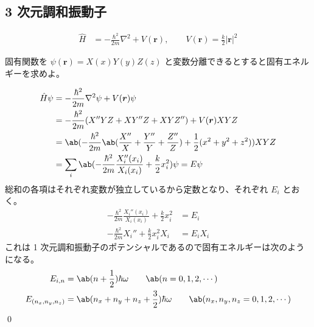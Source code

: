 \documentclass[uplatex,dvipdfmx,a4paper,11pt]{jlreq}
\makeatletter
\newcommand{\rr}{\bm{r}}
\newcommand{\laplacian}{\nabla^2}
\numberwithin{equation}{section}
\theoremstyle{definition}
\renewenvironment{proof}[1][\proofname]{\par
  \normalfont
  \topsep6\p@\@plus6\p@ \trivlist
  \item[\hskip\labelsep{\bfseries #1}\@addpunct{\bfseries}]\ignorespaces\quad\par
}{%
  \qed\endtrivlist\@endpefalse
}
\renewcommand\proofname{証明}
\makeatother
\begin{document}
\subsection{3 次元調和振動子}
\begin{align}
  \hat{H} & = -\frac{\hbar^2}{2m}\laplacian + V(\rr), \qquad V(\rr) = \frac{k}{2}|\rr|^2
\end{align}
\begin{problem}
固有関数を $\psi(\rr) = X(x)Y(y)Z(z)$ と変数分離できるとすると固有エネルギーを求めよ。
\end{problem}
\begin{proof}
  \begin{align}
    \hat{H}\psi & = -\frac{\hbar^2}{2m}\laplacian\psi + V(\rr)\psi                                                               \\
                & = -\frac{\hbar^2}{2m}(X''YZ + XY''Z + XYZ'') + V(\rr)XYZ                                                       \\
                & = \ab(-\frac{\hbar^2}{2m}\ab(\frac{X''}{X} + \frac{Y''}{Y} + \frac{Z''}{Z}) + \frac{1}{2}(x^2 + y^2 + z^2))XYZ \\
                & = \sum_{i}\ab(-\frac{\hbar^2}{2m}\frac{X_i''(x_i)}{X_i(x_i)} + \frac{k}{2}x_i^2)\psi = E\psi
  \end{align}
  総和の各項はそれぞれ変数が独立しているから定数となり、それぞれ $E_i$ とおく。
  \begin{align}
    -\frac{\hbar^2}{2m}\frac{X_i''(x_i)}{X_i(x_i)} + \frac{k}{2}x_i^2 & = E_i    \\
    -\frac{\hbar^2}{2m}X_i'' + \frac{k}{2}x_i^2X_i                    & = E_iX_i
  \end{align}
  これは 1 次元調和振動子のポテンシャルであるので固有エネルギーは次のようになる。
  \begin{align}
    E_{i,n}             & = \ab(n + \frac{1}{2})\hbar\omega \qquad \ab(n = 0, 1, 2, \cdots)                           \\
    E_{(n_x, n_y, n_z)} & = \ab(n_x + n_y + n_z + \frac{3}{2})\hbar\omega \qquad \ab(n_x, n_y, n_z = 0, 1, 2, \cdots)
  \end{align}
\end{proof}
\end{document}
